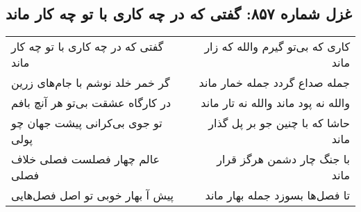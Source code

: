 \begin{center}
\section*{غزل شماره ۸۵۷: گفتی که در چه کاری با تو چه کار ماند}
\label{sec:0857}
\begin{longtable}{l p{0.5cm} r}
گفتی که در چه کاری با تو چه کار ماند
&&
کاری که بی‌تو گیرم والله که زار ماند
\\
گر خمر خلد نوشم با جام‌های زرین
&&
جمله صداع گردد جمله خمار ماند
\\
در کارگاه عشقت بی‌تو هر آنچ بافم
&&
والله نه پود ماند والله نه تار ماند
\\
تو جوی بی‌کرانی پیشت جهان چو پولی
&&
حاشا که با چنین جو بر پل گذار ماند
\\
عالم چهار فصلست فصلی خلاف فصلی
&&
با جنگ چار دشمن هرگز قرار ماند
\\
پیش آ بهار خوبی تو اصل فصل‌هایی
&&
تا فصل‌ها بسوزد جمله بهار ماند
\\
\end{longtable}
\end{center}
